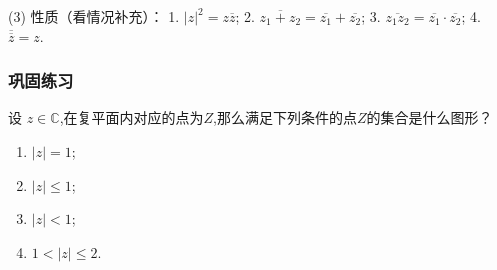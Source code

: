 (3) 性质（看情况补充）：
1. $|z|^2=z\overline{z}$;
2. $\overline{z_1+z_2}=\overline{z_1}+\overline{z_2}$;
3. $\overline{z_1 z_2}=\overline{z_1}\cdot\overline{z_2}$;
4. $\overline{\overline{z}}=z$.

\subsubsection{巩固练习}
\begin{example}[改编自书本 p72 例 3]
    设 $z\in \mathbb{C}$,在复平面内对应的点为$Z$,那么满足下列条件的点$Z$的集合是什么图形？
    \begin{enumerate}
        \item $|z|=1$;
        \item $|z|\leqslant 1$;
        \item $|z|< 1$;
        \item $1<|z|\leqslant 2$.
    \end{enumerate}
\end{example}
